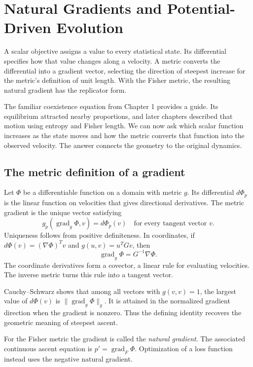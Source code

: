 \documentclass[11pt,oneside,openany]{book}
\theoremstyle{definition}
\theoremstyle{remark}
\newcommand{\grad}{\operatorname{grad}}
\numberwithin{equation}{chapter}
\begin{document}
\chapter{Natural Gradients and Potential-Driven Evolution}
\label{ch:natural}

A scalar objective assigns a value to every statistical state. Its differential specifies how that value changes along a velocity. A metric converts the differential into a gradient vector, selecting the direction of steepest increase for the metric's definition of unit length. With the Fisher metric, the resulting natural gradient has the replicator form.

The familiar coexistence equation from Chapter 1 provides a guide. Its equilibrium attracted nearby proportions, and later chapters described that motion using entropy and Fisher length. We can now ask which scalar function increases as the state moves and how the metric converts that function into the observed velocity. The answer connects the geometry to the original dynamics.

\section{The metric definition of a gradient}
Let $\Phi$ be a differentiable function on a domain with metric $g$. Its differential $d\Phi_p$ is the linear function on velocities that gives directional derivatives. The metric gradient is the unique vector satisfying
\begin{equation}\label{eq:gradientdefinition}
g_p(\grad_g\Phi,v)=d\Phi_p(v)
\quad\text{for every tangent vector }v.
\end{equation}
Uniqueness follows from positive definiteness. In coordinates, if $d\Phi(v)=(\nabla\Phi)^Tv$ and $g(u,v)=u^TGv$, then
\begin{equation}\label{eq:metricgradient}
\grad_g\Phi=G^{-1}\nabla\Phi.
\end{equation}
The coordinate derivatives form a covector, a linear rule for evaluating velocities. The inverse metric turns this rule into a tangent vector.

Cauchy--Schwarz shows that among all vectors with $g(v,v)=1$, the largest value of $d\Phi(v)$ is $\|\grad_g\Phi\|_g$. It is attained in the normalized gradient direction when the gradient is nonzero. Thus the defining identity recovers the geometric meaning of steepest ascent.

For the Fisher metric the gradient is called the \emph{natural gradient}. The associated continuous ascent equation is $p'=\grad_F\Phi$. Optimization of a loss function instead uses the negative natural gradient.
\end{document}
